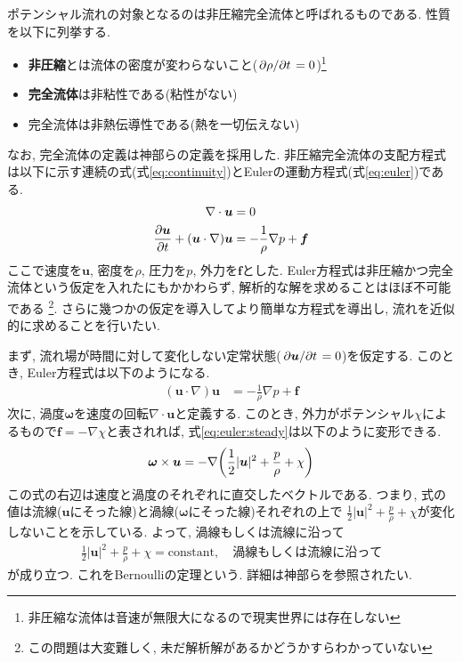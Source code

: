 \documentclass{ltjsarticle}
\begin{document}
ポテンシャル流れの対象となるのは非圧縮完全流体と呼ばれるものである. 
性質を以下に列挙する. 
\begin{itemize}
    \item \textbf{非圧縮}とは流体の密度が変わらないこと($\pdv*{\rho}{t}=0$)\footnote{非圧縮な流体は音速が無限大になるので現実世界には存在しない}
    \item \textbf{完全流体}は非粘性である(粘性がない)
    \item 完全流体は非熱伝導性である(熱を一切伝えない)
\end{itemize}
なお, 完全流体の定義は神部ら\cite{Kanbe1995}の定義を採用した. 
非圧縮完全流体の支配方程式は以下に示す連続の式(式\eqref{eq:continuity})とEulerの運動方程式(式\eqref{eq:euler})である. 
\begin{align}
    \nabla\cdot\bm{u} &= 0 \label{eq:continuity} \\
    \pdv{\bm{u}}{t} +(\bm{u}\cdot\nabla)\bm{u} &= -\frac{1}{\rho}\nabla p + \bm{f} \label{eq:euler}
\end{align}
ここで速度を$\bm{u}$, 密度を$\rho$, 圧力を$p$, 外力を$\bm{f}$とした.
Euler方程式は非圧縮かつ完全流体という仮定を入れたにもかかわらず, 解析的な解を求めることはほぼ不可能である
\footnote{この問題は大変難しく, 未だ解析解があるかどうかすらわかっていない}.
さらに幾つかの仮定を導入してより簡単な方程式を導出し, 流れを近似的に求めることを行いたい.

まず, 流れ場が時間に対して変化しない定常状態($\pdv*{\bm{u}}{t}=0$)を仮定する.
このとき, Euler方程式は以下のようになる.
\begin{align}
    (\bm{u}\cdot\nabla)\bm{u} &= -\frac{1}{\rho}\nabla p + \bm{f} \label{eq:euler:steady}
\end{align}
次に, 渦度$\bm{\omega}$を速度の回転$\nabla\cdot\bm{u}$と定義する.
このとき, 外力がポテンシャル$\chi$によるもので$\bm{f}=-\nabla \chi$と表されれば,
式\eqref{eq:euler:steady}は以下のように変形できる.
\begin{align}
    \bm{\omega}\times\bm{u}=-\nabla\qty(\frac{1}{2}|\bm{u}|^2 + \frac{p}{\rho}+\chi)
    \label{eq:euler:steady:vorticity}
\end{align}
この式の右辺は速度と渦度のそれぞれに直交したベクトルである.
つまり, 式の値は流線($\bm{u}$にそった線)と渦線($\bm{\omega}$にそった線)それぞれの上で
$\frac{1}{2}|\bm{u}|^2 + \frac{p}{\rho}+\chi$が変化しないことを示している.
よって, 渦線もしくは流線に沿って
\begin{align}
    \frac{1}{2}|\bm{u}|^2 + \frac{p}{\rho}+\chi=\mathrm{constant}, \quad\mathrm{渦線もしくは流線に沿って}
    \label{eq:bernoulli}
\end{align}
が成り立つ. これをBernoulliの定理という.
詳細は神部ら\cite{Kanbe1995}を参照されたい. 
\end{document}
